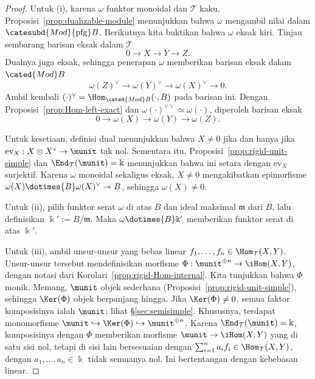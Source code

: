 \begin{proof}
	Untuk (i), karena $\omega$ funktor monoidal dan $\mathcal{T}$ kaku,
	Proposisi~\ref{prop:dualizable-module} menunjukkan bahwa $\omega$
	mengambil nilai dalam $\catesubd{Mod}{\mathrm{pfg}}B$. Berikutnya kita
	buktikan bahwa $\omega$ eksak kiri. Tinjau sembarang barisan eksak dalam
	$\mathcal{T}$
	\[ 0 \to X \to Y \to Z. \]
	Dualnya juga eksak, sehingga penerapan $\omega$ memberikan barisan eksak
	dalam $\cated{Mod}B$
	\[ \omega(Z)^\vee \to \omega(Y)^\vee \to \omega(X)^\vee \to 0. \]
	Ambil kembali
	$(\mathord\cdot)^\vee=\Hom_{\cated{Mod}B}(\mathord\cdot,B)$ pada
	barisan ini. Dengan Proposisi~\ref{prop:Hom-left-exact} dan
	$\omega(\mathord\cdot)^{\vee\vee}\simeq\omega(\mathord\cdot)$,
	diperoleh barisan eksak
	\[ 0 \to \omega(X) \to \omega(Y) \to \omega(Z). \]

	Untuk kesetiaan, definisi dual menunjukkan bahwa $X\neq0$ jika dan
	hanya jika $\mathrm{ev}_X:X\otimes X^*\to\munit$ tak nol. Sementara itu,
	Proposisi~\ref{prop:rigid-unit-simple} dan
	$\End_{\mathcal{T}}(\munit)=\Bbbk$ menunjukkan bahwa ini setara dengan
	$\mathrm{ev}_X$ surjektif. Karena $\omega$ monoidal sekaligus eksak,
	$X\neq0$ mengakibatkan epimorfisme
	$\omega(X)\dotimes{B}\omega(X)^\vee\twoheadrightarrow B$, sehingga
	$\omega(X)\neq0$.

	Untuk (ii), pilih funktor serat $\omega$ di atas $B$ dan ideal
	maksimal $\mathfrak m$ dari $B$, lalu definisikan
	$\Bbbk':=B/\mathfrak m$. Maka $\omega\dotimes{B}\Bbbk'$ memberikan
	funktor serat di atas $\Bbbk'$.

	Untuk (iii), ambil unsur-unsur yang bebas linear
	$f_1,\ldots,f_n\in\Hom_{\mathcal{T}}(X,Y)$. Unsur-unsur tersebut
	mendefinisikan morfisme
	$\Phi:\munit^{\oplus n}\to\iHom(X,Y)$, dengan notasi dari
	Korolari~\ref{prop:rigid-Hom-internal}. Kita tunjukkan bahwa $\Phi$
	monik. Memang, $\munit$ objek sederhana
	(Proposisi~\ref{prop:rigid-unit-simple}), sehingga $\Ker(\Phi)$ objek
	berpanjang hingga. Jika $\Ker(\Phi)\neq0$, semua faktor komposisinya
	ialah $\munit$; lihat \S\ref{sec:semisimple}. Khususnya, terdapat
	monomorfisme
	$\munit\hookrightarrow\Ker(\Phi)\hookrightarrow\munit^{\oplus n}$.
	Karena $\End_{\mathcal{T}}(\munit)=\Bbbk$, komposisinya dengan $\Phi$
	memberikan morfisme $\munit\to\iHom(X,Y)$ yang di satu sisi nol, tetapi
	di sisi lain bersesuaian dengan
	$\sum_{i=1}^na_if_i\in\Hom_{\mathcal{T}}(X,Y)$, dengan
	$a_1,\ldots,a_n\in\Bbbk$ tidak semuanya nol. Ini bertentangan dengan
	kebebasan linear.


\end{proof}

